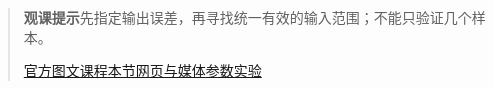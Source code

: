 \begin{quote}\small\textbf{观课提示}\quad 先指定输出误差，再寻找统一有效的输入范围；不能只验证几个样本。

\href{https://www.3blue1brown.com/lessons/epsilon-delta/}{官方图文课程}\quad\href{https://vitael04213.github.io/3blue1brown-notes/lessons/epsilon-delta.html}{本节网页与媒体}\quad\href{https://vitael04213.github.io/3blue1brown-notes/lab.html\#derivative}{参数实验}
\end{quote}
